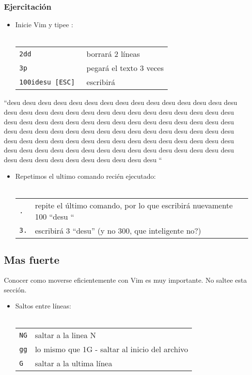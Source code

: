 \documentclass[12pt]{article}
\begin{document}
\subsubsection{Ejercitación}


\begin{itemize}
	\item Inicie Vim y tipee : \\ \\
\begin{tabular}{ l l }
	\texttt{2dd} & borrará 2 líneas \\
	\texttt{3p} & pegará el texto 3 veces \\
	\texttt{100idesu [ESC] } & escribirá \\
\end{tabular}
\end{itemize}
“desu desu desu desu desu desu desu desu desu desu desu desu desu desu desu desu desu desu desu desu desu desu desu desu desu desu desu desu desu desu desu desu desu desu desu desu desu desu desu desu desu desu desu desu desu desu desu desu desu desu desu desu desu desu desu desu desu desu desu desu desu desu desu desu desu desu desu desu desu desu desu desu desu desu desu desu desu desu desu desu desu desu desu desu desu desu desu desu desu desu desu desu desu desu desu desu desu desu desu desu “
\begin{itemize}
	\item Repetimos el ultimo comando recién ejecutado: \\ \\
\begin{tabular}{ l l }
	\texttt{.} & repite el último comando, por lo que escribirá nuevamente 100 “desu “ \\
	\texttt{3.} & escribirá 3 “desu” (y no 300, que inteligente no?) \\
\end{tabular}
\end{itemize}



\subsection{Mas fuerte}

Conocer como moverse eficientemente con Vim es muy importante. No saltee esta
sección.

\begin{itemize}
	\item Saltos entre líneas:  \\ \\
\begin{tabular}{ l l }
	\texttt{NG} & saltar a la linea N \\
	\texttt{gg} & lo mismo que 1G - saltar al inicio del archivo \\
	\texttt{G} & saltar a la ultima línea \\
\end{tabular}
\end{itemize}
\end{document}
